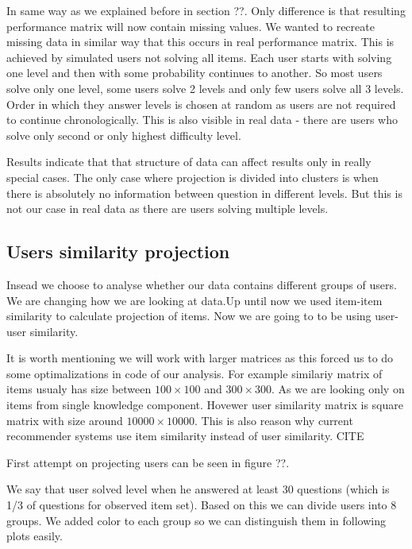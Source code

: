 \documentclass[
  digital, %
  table,   %
  nolof,     %
  nolot,     %
  nocover
]{fithesis3}
\begin{document}
In same way as we explained before in section ??. Only difference is that resulting performance matrix will now contain missing values. We wanted to recreate missing data in similar way that this occurs in real performance matrix. This is achieved by simulated users not solving all items. Each user starts with solving one level and then with some probability continues to another. So most users solve only one level, some users solve 2 levels and only few users solve all 3 levels. Order in which they answer levels is chosen at random as users are not required to continue chronologically. This is also visible in real data - there are users who solve only second or only highest difficulty level.

Results indicate that that structure of data can affect results only in really special cases. The only case where projection is divided into clusters is when there is absolutely no information between question in different levels. But this is not our case in real data as there are users solving multiple levels.


\subsection{Users similarity
projection}\label{users-similarity-projection}

Insead we choose to analyse whether our data contains different groups
of users. We are changing how we are looking at data.Up until now we
used item-item similarity to calculate projection of items. Now we are
going to to be using user-user similarity.

It is worth mentioning we will work with larger matrices as this forced
us to do some optimalizations in code of our analysis. For example
similariy matrix of items usualy has size between $100\times 100$ and
$300\times 300$. As we are looking only on items from single knowledge
component. Hovewer user similarity matrix is square matrix with size
around $10 000\times 10 000$. This is also reason why current
recommender systems use item similarity instead of user similarity. CITE

First attempt on projecting users can be seen in figure ??.


We say that user solved level when he answered at least 30 questions
(which is 1/3 of questions for observed item set). Based on this we can
divide users into 8 groups. We added color to each group so we can
distinguish them in following plots easily.
\end{document}
